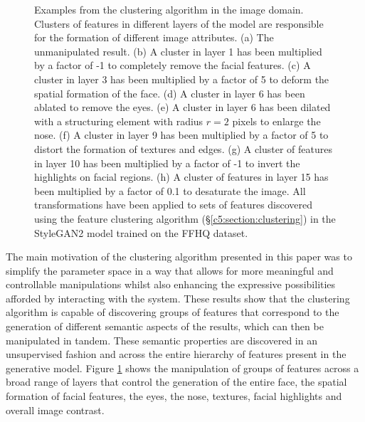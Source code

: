 \begin{figure}[!htbp]
        \hfill
        \hfill
       \caption[A comparison of different transforms being applied to different clusters in various layers of StyleGAN2]{Examples from the clustering algorithm in the image domain. Clusters of features in different layers of the model are responsible for the formation of different image attributes. (a) The unmanipulated result. (b) A cluster in layer 1 has been multiplied by a factor of -1 to completely remove the facial features. (c) A cluster in layer 3 has been multiplied by a factor of 5 to deform the spatial formation of the face. (d) A cluster in layer 6 has been ablated to remove the eyes. (e) A cluster in layer 6 has been dilated with a structuring element with radius $r=2$ pixels to enlarge the nose. (f) A cluster in layer 9 has been multiplied by a factor of 5 to distort the formation of textures and edges. (g) A cluster of features in layer 10 has been multiplied by a factor of -1 to invert the highlights on facial regions. (h) A cluster of features in layer 15 has been multiplied by a factor of 0.1 to desaturate the image. All transformations have been applied to sets of features discovered using the feature clustering algorithm (\S \ref{c5:section:clustering}) in the StyleGAN2 model trained on the FFHQ dataset.}
       \label{fig:c5:cluster_layer_comp_image}
    \end{figure}

The main motivation of the clustering algorithm presented in this paper was to simplify the parameter space in a way that allows for more meaningful and controllable manipulations whilst also enhancing the expressive possibilities afforded by interacting with the system. 
These results show that the clustering algorithm is capable of discovering groups of features that correspond to the generation of different semantic aspects of the results, which can then be manipulated in tandem. 
These semantic properties are discovered in an unsupervised fashion and across the entire hierarchy of features present in the generative model.
Figure \ref{fig:c5:cluster_layer_comp_image} shows the manipulation of groups of features across a broad range of layers that control the generation of the entire face, the spatial formation of facial features, the eyes, the nose, textures, facial highlights and overall image contrast.

